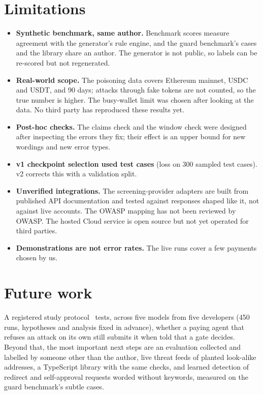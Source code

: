 \documentclass[11pt]{article}
\begin{document}
\section{Limitations}

\begin{itemize}
  \item \textbf{Synthetic benchmark, same author.} Benchmark scores measure agreement with the generator's rule engine, and the guard benchmark's cases and the library share an author. The generator is not public, so labels can be re-scored but not regenerated.
  \item \textbf{Real-world scope.} The poisoning data covers Ethereum mainnet, USDC and USDT, and 90 days; attacks through fake tokens are not counted, so the true number is higher. The busy-wallet limit was chosen after looking at the data. No third party has reproduced these results yet.
  \item \textbf{Post-hoc checks.} The claims check and the window check were designed after inspecting the errors they fix; their effect is an upper bound for new wordings and new error types.
  \item \textbf{v1 checkpoint selection used test cases} (loss on 300 sampled test cases). v2 corrects this with a validation split.
  \item \textbf{Unverified integrations.} The screening-provider adapters are built from published API documentation and tested against responses shaped like it, not against live accounts. The OWASP mapping has not been reviewed by OWASP. The hosted Cloud service is open source but not yet operated for third parties.
  \item \textbf{Demonstrations are not error rates.} The live runs cover a few payments chosen by us.
\end{itemize}

\section{Future work}

A registered study protocol~\cite{deference} tests, across five models from five developers (450 runs, hypotheses and analysis fixed in advance), whether a paying agent that refuses an attack on its own still submits it when told that a gate decides. Beyond that, the most important next steps are an evaluation collected and labelled by someone other than the author, live threat feeds of planted look-alike addresses, a TypeScript library with the same checks, and learned detection of redirect and self-approval requests worded without keywords, measured on the guard benchmark's subtle cases.
\end{document}
